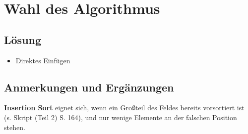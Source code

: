 \chapter{Wahl des Algorithmus}

\section*{Lösung}

\begin{itemize}
    \item Direktes Einfügen
\end{itemize}


\section*{Anmerkungen und Ergänzungen}

\textbf{Insertion Sort} eignet sich, wenn ein Großteil des Feldes bereits vorsortiert ist (s. Skript (Teil 2) S. 164), und nur wenige Elemente an der falschen Position stehen.